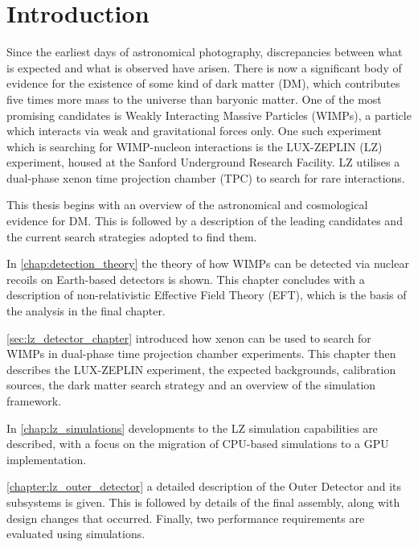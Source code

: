 \chapter{Introduction}
\par
Since the earliest days of astronomical photography, discrepancies between what is expected and what is observed have arisen.
There is now a significant body of evidence for the existence of some kind of dark matter (DM), which contributes five times more mass to the universe than baryonic matter.
One of the most promising candidates is Weakly Interacting Massive Particles (WIMPs), a particle which interacts via weak and gravitational forces only.
One such experiment which is searching for WIMP-nucleon interactions is the LUX-ZEPLIN (LZ) experiment, housed at the Sanford Underground Research Facility.
LZ utilises a dual-phase xenon time projection chamber (TPC) to search for rare interactions.

\par
This thesis begins with an overview of the astronomical and cosmological evidence for DM.
This is followed by a description of the leading candidates and the current search strategies adopted to find them.

\par
In \autoref{chap:detection_theory} the theory of how WIMPs can be detected via nuclear recoils on Earth-based detectors is shown.
This chapter concludes with a description of non-relativistic Effective Field Theory (EFT), which is the basis of the analysis in the final chapter.

\par
\autoref{sec:lz_detector_chapter} introduced how xenon can be used to search for WIMPs in dual-phase time projection chamber experiments.
This chapter then describes the LUX-ZEPLIN experiment, the expected backgrounds, calibration sources, the dark matter search strategy and an overview of the simulation framework.

\par
In \autoref{chap:lz_simulations} developments to the LZ simulation capabilities are described, with a focus on the migration of CPU-based simulations to a GPU implementation.

\par
\autoref{chapter:lz_outer_detector} a detailed description of the Outer Detector and its subsystems is given.
This is followed by details of the final assembly, along with design changes that occurred.
Finally, two performance requirements are evaluated using simulations.

